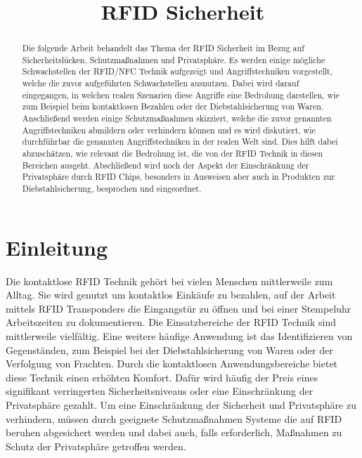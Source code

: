 \documentclass[conference]{IEEEtran}
\begin{document}
\title{RFID Sicherheit}


\author{
}

\maketitle

\begin{abstract}
Die folgende Arbeit behandelt das Thema der RFID Sicherheit im Bezug auf Sicherheitslücken, Schutzmaßnahmen und Privatsphäre. Es werden einige mögliche Schwachstellen der RFID/NFC Technik aufgezeigt und Angriffstechniken vorgestellt, welche die zuvor aufgeführten Schwachstellen ausnutzen. Dabei wird darauf eingegangen, in welchen realen Szenarien diese Angriffe eine Bedrohung darstellen, wie zum Beispiel beim kontaktlosen Bezahlen oder der Diebstahlsicherung von Waren. Anschließend werden einige Schutzmaßnahmen skizziert, welche die zuvor genannten Angriffstechniken abmildern oder verhindern können und es wird diskutiert, wie durchführbar die genannten Angriffstechniken in der realen Welt sind. Dies hilft dabei abzuschätzen, wie relevant die Bedrohung ist, die von der RFID Technik in diesen Bereichen ausgeht. Abschließend wird noch der Aspekt der Einschränkung der Privatsphäre durch RFID Chips, besonders in Ausweisen aber auch in Produkten zur Diebstahlsicherung, besprochen und eingeordnet.
\end{abstract}

\section{Einleitung}
Die kontaktlose RFID Technik gehört bei vielen Menschen mittlerweile zum Alltag. Sie wird genutzt um kontaktlos Einkäufe zu bezahlen, auf der Arbeit mittels RFID Transponders die Eingangstür zu öffnen und bei einer Stempeluhr Arbeitszeiten zu dokumentieren. Die Einsatzbereiche der RFID Technik sind mittlerweile vielfältig. Eine weitere häufige Anwendung ist das Identifizieren von Gegenständen, zum Beispiel bei der Diebstahlsicherung von Waren oder der Verfolgung von Frachten. Durch die kontaktlosen Anwendungsbereiche bietet diese Technik einen erhöhten Komfort. Dafür wird häufig der Preis eines signifikant verringerten Sicherheitsniveaus oder eine Einschränkung der Privatsphäre gezahlt. Um eine Einschränkung der Sicherheit und Privatsphäre zu verhindern, müssen durch geeignete Schutzmaßnahmen Systeme die auf RFID beruhen abgesichert werden und dabei auch, falls erforderlich, Maßnahmen zu Schutz der Privatsphäre getroffen werden.
\end{document}

